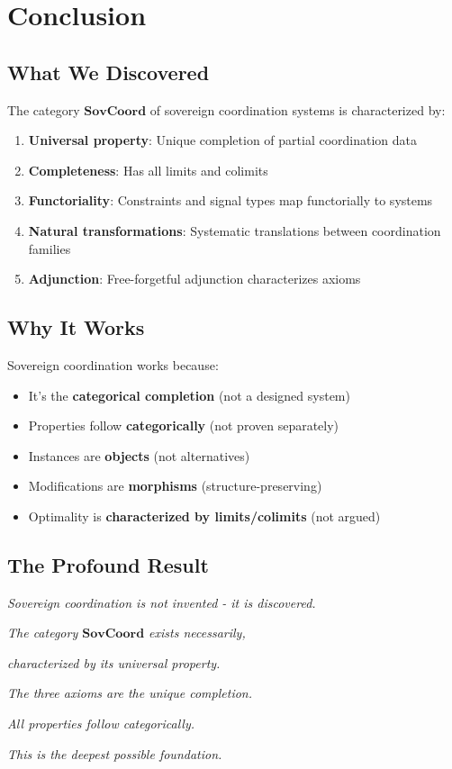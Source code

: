 \documentclass[11pt,a4paper]{article}
\theoremstyle{definition}
\theoremstyle{remark}
\newcommand{\SovCoord}{\mathbf{SovCoord}}
\begin{document}
\section{Conclusion}

\subsection{What We Discovered}

The category $\SovCoord$ of sovereign coordination systems is characterized by:
\begin{enumerate}
\item \textbf{Universal property}: Unique completion of partial coordination data
\item \textbf{Completeness}: Has all limits and colimits
\item \textbf{Functoriality}: Constraints and signal types map functorially to systems
\item \textbf{Natural transformations}: Systematic translations between coordination families
\item \textbf{Adjunction}: Free-forgetful adjunction characterizes axioms
\end{enumerate}

\subsection{Why It Works}

Sovereign coordination works because:
\begin{itemize}
\item It's the \textbf{categorical completion} (not a designed system)
\item Properties follow \textbf{categorically} (not proven separately)
\item Instances are \textbf{objects} (not alternatives)
\item Modifications are \textbf{morphisms} (structure-preserving)
\item Optimality is \textbf{characterized by limits/colimits} (not argued)
\end{itemize}

\subsection{The Profound Result}

\begin{center}
\Large
\textit{Sovereign coordination is not invented - it is discovered.}

\medskip

\textit{The category $\SovCoord$ exists necessarily,}

\textit{characterized by its universal property.}

\medskip

\textit{The three axioms are the unique completion.}

\textit{All properties follow categorically.}

\medskip

\textit{This is the deepest possible foundation.}
\end{center}
\end{document}

